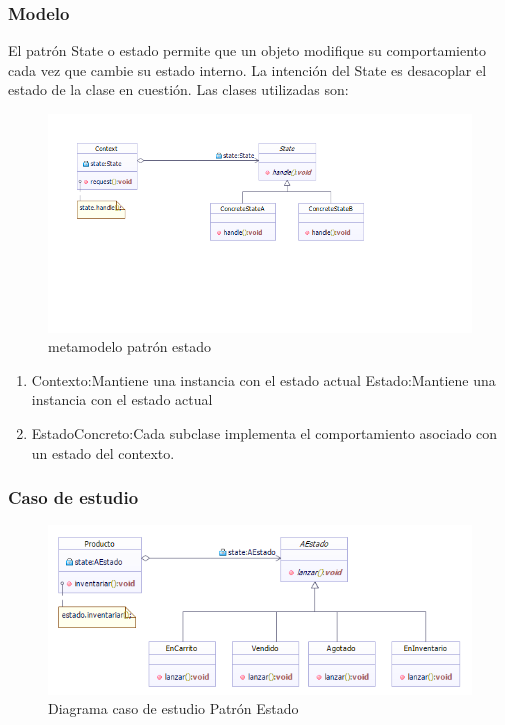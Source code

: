 \subsubsection{Modelo}

El patrón State o estado permite que un objeto modifique su comportamiento cada vez que cambie su estado interno. La intención del State es desacoplar el estado de la clase en cuestión. Las clases utilizadas son:

\begin{figure}[th!]
	\centering
	\includegraphics[width=0.7\linewidth]{arquitectura/imagenes/PatronEstado}
	\caption{metamodelo patrón estado}
	\label{fig:metamodelo patron estado}
\end{figure}

\begin{enumerate}
	\item Contexto:Mantiene una instancia con el estado actual Estado:Mantiene una instancia con el estado actual
	\item EstadoConcreto:Cada subclase implementa el comportamiento asociado con un estado del contexto.
\end{enumerate}  

\subsubsection{Caso de estudio}

\begin{figure}[th!]
	\centering
	\includegraphics[width=0.7\linewidth]{arquitectura/imagenes/PatronEstadoCasoEstudio}
	\caption{Diagrama caso de estudio Patrón Estado}
	\label{fig:patronestadocasoestudio}
\end{figure}


